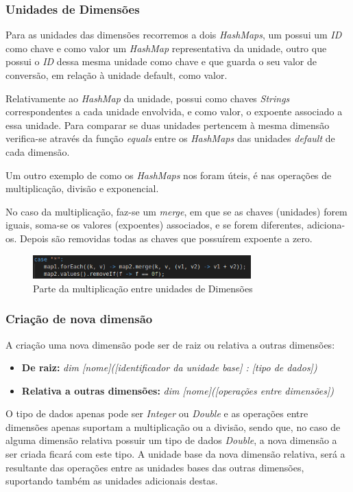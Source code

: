 \documentclass[10pt,portuguese]{article}
\begin{document}
\subsubsection{Unidades de Dimensões}
\par Para as unidades das dimensões recorremos a dois \emph{HashMaps}, um possui um \emph{ID} como chave e como valor um \emph{HashMap} representativa da unidade, outro que possui o \emph{ID} dessa mesma unidade como chave e que guarda o seu valor de conversão, em relação à unidade default, como valor.
\par Relativamente ao \emph{HashMap} da unidade, possui como chaves \emph{Strings} correspondentes a cada unidade envolvida, e como valor, o expoente associado a essa unidade. Para comparar se duas unidades pertencem à mesma dimensão verifica-se através da função \emph{equals} entre os \emph{HashMaps} das unidades \emph{default} de cada dimensão.
\par Um outro exemplo de como os \emph{HashMaps} nos foram úteis, é nas operações de multiplicação, divisão e exponencial.
\par No caso da multiplicação, faz-se um \emph{merge}, em que se as chaves (unidades) forem iguais, soma-se os valores (expoentes) associados, e se forem diferentes, adiciona-os. Depois são removidas todas as chaves que possuírem expoente a zero. 
\begin{figure}[h]
\centering
\includegraphics[width=0.75\textwidth]{images/unknown_2.png}
\caption{Parte da multiplicação entre unidades de Dimensões}
\end{figure}
\subsubsection{Criação de nova dimensão}
\par A criação uma nova dimensão pode ser de raiz ou relativa a outras dimensões:

\begin{itemize}
    \item \textbf{De raiz:} \textit{dim [nome]([identificador da unidade base] : [tipo de dados])}
    \item \textbf{Relativa a outras dimensões:} \textit{dim [nome]([operações entre dimensões])}
\end{itemize}

\par O tipo de dados apenas pode ser \textit{Integer} ou \textit{Double} e as operações entre dimensões apenas suportam a multiplicação ou a divisão, sendo que, no caso de alguma dimensão relativa possuir um tipo de dados \textit{Double}, a nova dimensão a ser criada ficará com este tipo. A unidade base da nova dimensão relativa, será a resultante das operações entre as unidades bases das outras dimensões, suportando também as unidades adicionais destas.
\end{document}
